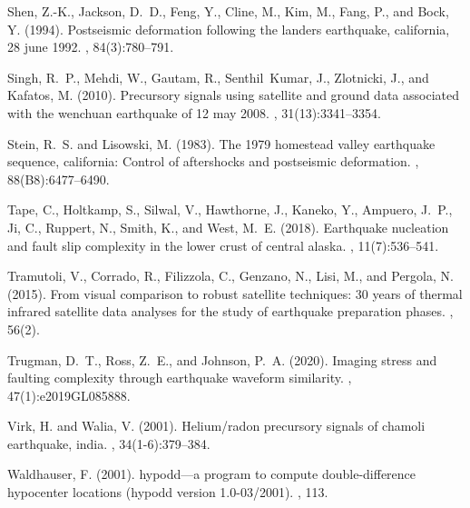 \documentclass[a4paper,12pt,twoside]{article}
\begin{document}
\begin{thebibliography}{}
Shen, Z.-K., Jackson, D.~D., Feng, Y., Cline, M., Kim, M., Fang, P., and Bock,
  Y. (1994).
\newblock Postseismic deformation following the landers earthquake, california,
  28 june 1992.
,
  84(3):780--791.

Singh, R.~P., Mehdi, W., Gautam, R., Senthil~Kumar, J., Zlotnicki, J., and
  Kafatos, M. (2010).
\newblock Precursory signals using satellite and ground data associated with
  the wenchuan earthquake of 12 may 2008.
, 31(13):3341--3354.

Stein, R.~S. and Lisowski, M. (1983).
\newblock The 1979 homestead valley earthquake sequence, california: Control of
  aftershocks and postseismic deformation.
,
  88(B8):6477--6490.

Tape, C., Holtkamp, S., Silwal, V., Hawthorne, J., Kaneko, Y., Ampuero, J.~P.,
  Ji, C., Ruppert, N., Smith, K., and West, M.~E. (2018).
\newblock Earthquake nucleation and fault slip complexity in the lower crust of
  central alaska.
, 11(7):536--541.

Tramutoli, V., Corrado, R., Filizzola, C., Genzano, N., Lisi, M., and Pergola,
  N. (2015).
\newblock From visual comparison to robust satellite techniques: 30 years of
  thermal infrared satellite data analyses for the study of earthquake
  preparation phases.
, 56(2).


Trugman, D.~T., Ross, Z.~E., and Johnson, P.~A. (2020).
\newblock Imaging stress and faulting complexity through earthquake waveform
  similarity.
, 47(1):e2019GL085888.

Virk, H. and Walia, V. (2001).
\newblock Helium/radon precursory signals of chamoli earthquake, india.
, 34(1-6):379--384.

Waldhauser, F. (2001).
\newblock hypodd—a program to compute double-difference hypocenter locations
  (hypodd version 1.0-03/2001).
, 113.


\end{thebibliography}
\end{document}
